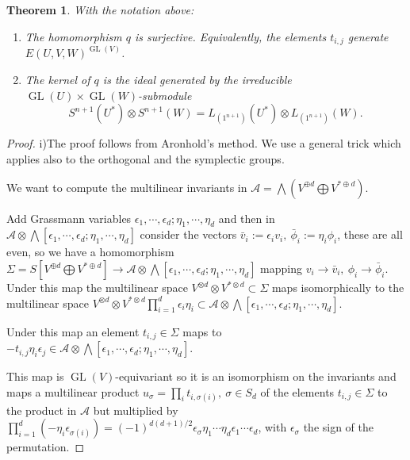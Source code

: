 \documentclass[10pt]{amsart}
\newtheorem{theorem}{Theorem}[section]
\theoremstyle{definition}
\theoremstyle{remark}
\newcommand{\GL}{\operatorname{GL}}
\begin{document}
\begin{theorem}
\label{thm:skew-fft-sft}
With the notation above:
\begin{enumerate}[label=\textnormal{(\roman*)}]
\item The homomorphism $q$ is surjective.  Equivalently, the elements $t_{i,j}$ generate $E(U,V,W)^{\GL(V)}$.
\item The kernel of $q$ is the ideal generated by the irreducible $\GL(U)\times\GL(W)$-submodule
\[
S^{n+1}(U^*)\otimes S^{n+1}(W)
=
L_{(1^{n+1})}(U^*)\otimes L_{(1^{n+1})}(W).
\]
\end{enumerate}
\end{theorem}

\begin{proof} i)\quad The proof follows from Aronhold's method. We use a general trick which applies also to the orthogonal and the symplectic groups.\smallskip


We want to compute the multilinear invariants in $\mathcal A =\bigwedge (V^{\oplus d}\bigoplus V^{* \oplus d})$.  \smallskip



Add Grassmann variables  $\epsilon_1,\cdots,\epsilon_d;\eta_1,\cdots,\eta_d$  and then in $\mathcal A \otimes \bigwedge[\epsilon_1,\cdots,\epsilon_d;\eta_1,\cdots,\eta_d]$ consider the vectors $\bar v_i:=\epsilon_iv_i,\ \bar \phi_i:=\eta_i \phi_i$, these are all even, so we have a homomorphism $\Sigma=S[V^{\oplus d}\bigoplus V^{* \oplus d}]\to \mathcal A \otimes \bigwedge[\epsilon_1,\cdots,\epsilon_d;\eta_1,\cdots,\eta_d]$  mapping $v_i\to \bar v_i,\ \phi_i\to\bar\phi_i$. Under this map  the multilinear space $V^{\otimes d}\otimes V^{* \otimes d}\subset\Sigma$ maps isomorphically to  the multilinear space $V^{\otimes d}\otimes V^{* \otimes d}\prod_{i=1}^d\epsilon_i\eta_i\subset \mathcal A \otimes \bigwedge[\epsilon_1,\cdots,\epsilon_d;\eta_1,\cdots,\eta_d]$. \smallskip

Under this map an element  $t_{i,j}\in \Sigma$   maps to $-t_{i,j}\eta_i\epsilon_j\in  \mathcal A \otimes \bigwedge[\epsilon_1,\cdots,\epsilon_d;\eta_1,\cdots,\eta_d]$.\smallskip

  This map is $\GL(V)$-equivariant so it is an isomorphism on the invariants and maps a multilinear product  $u_\sigma=\prod_it_{i,\sigma(i)},\ \sigma\in S_d$ of the elements $t_{i,j}\in \Sigma$  to the   product in $\mathcal A $  but multiplied by $\prod_{i=1}^d(-\eta_i\epsilon_{\sigma(i)})=(-1)^{d(d+1)/2}\epsilon_\sigma \eta_1\cdots\eta_d\epsilon_1\cdots\epsilon_d$, with $\epsilon_\sigma$  the sign of the permutation.\smallskip


\end{proof}
\end{document}
